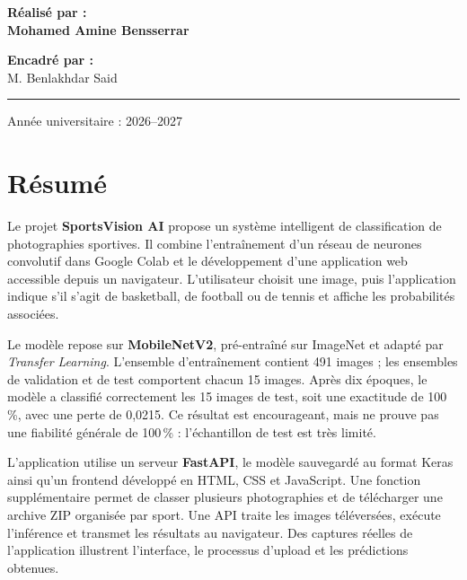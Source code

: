 \documentclass[11pt,a4paper,oneside]{report}
\begin{document}
\begin{titlepage}
\begin{center}
\vfill
\begin{minipage}[t]{0.52\linewidth}
\textbf{\color{marine}Réalisé par :}\\[4pt]
\large\textbf{Mohamed Amine Bensserrar}
\end{minipage}
\begin{minipage}[t]{0.43\linewidth}
\textbf{\color{marine}Encadré par :}\\[4pt]
\large M. Benlakhdar Said
\end{minipage}
\vspace{0.55cm}\par
{\color{marine}\rule{\textwidth}{0.75pt}}\par
\vspace{0.25cm}
{\large Année universitaire : 2026--2027}
\end{center}
\end{titlepage}

\chapter*{Résumé}
Le projet \textbf{SportsVision AI} propose un système intelligent de classification de photographies sportives. Il combine l'entraînement d'un réseau de neurones convolutif dans Google Colab et le développement d'une application web accessible depuis un navigateur. L'utilisateur choisit une image, puis l'application indique s'il s'agit de basketball, de football ou de tennis et affiche les probabilités associées.

Le modèle repose sur \textbf{MobileNetV2}, pré-entraîné sur ImageNet et adapté par \emph{Transfer Learning}. L'ensemble d'entraînement contient 491 images ; les ensembles de validation et de test comportent chacun 15 images. Après dix époques, le modèle a classifié correctement les 15 images de test, soit une exactitude de 100\,\%, avec une perte de 0,0215. Ce résultat est encourageant, mais ne prouve pas une fiabilité générale de 100\,\% : l'échantillon de test est très limité.

L'application utilise un serveur \textbf{FastAPI}, le modèle sauvegardé au format Keras ainsi qu'un frontend développé en HTML, CSS et JavaScript. Une fonction supplémentaire permet de classer plusieurs photographies et de télécharger une archive ZIP organisée par sport. Une API traite les images téléversées, exécute l'inférence et transmet les résultats au navigateur. Des captures réelles de l'application illustrent l'interface, le processus d'upload et les prédictions obtenues.
\end{document}
